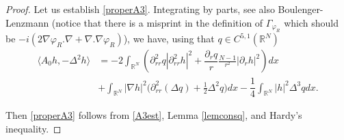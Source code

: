 \documentclass[a4paper,two-side,10pt]{amsart}
\newcommand{\R}{\mathbb{R}}
\numberwithin{equation}{section}
\begin{document}
\begin{proof}
Let us establish \eqref{properA3}. Integrating by parts, see also Boulenger-Lenzmann
\cite[pp. 513-515]{bou-lenz} (notice that there is a misprint in the definition of $\Gamma_{\varphi_R}$ which should be $-i(2 \nabla \varphi_R .\nabla +\nabla. \nabla \varphi_R)$), we have, using that $q\in C^{5,1}(\R^N)$
\begin{align}\label{A3est}
\langle A_0 h ,-\Delta^2 h\rangle &= -2 \int_{\R^N}\left( \partial_{rr}^2 q |\partial_{rr}^2 h|^2 +\dfrac{\partial_r q}{r} \frac{N-1}{r^2}|\partial_r h|^2 \right) dx \\
&+ \int_{\R^N} |\nabla h |^2 \big(\partial^2_{rr} (\Delta q) +\frac{1}{2}\Delta^2 q\big) dx -\dfrac{1}{4} \int_{\R^N}  |h|^2 \Delta^3 q dx.\nonumber 
\end{align}

Then \eqref{properA3} follows from \eqref{A3est},  %
Lemma \ref{lemconsq}, and Hardy's inequality. %



\end{proof}
\end{document}
